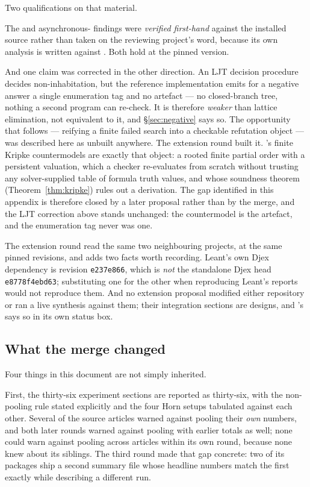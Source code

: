 Two qualifications on that material.

The  and asynchronous- findings were
\emph{verified first-hand} against the installed  source rather
than taken on the reviewing project's word, because its own analysis is written
against . Both hold at the pinned version.

And one claim was corrected in the other direction. An \textsf{LJT} decision
procedure decides non-inhabitation, but the reference implementation emits for
a negative answer a single enumeration tag and no artefact --- no closed-branch
tree, nothing a second program can re-check. It is therefore \emph{weaker} than
lattice elimination, not equivalent to it, and \S\ref{sec:negative} says so.
The opportunity that follows --- reifying a finite failed search into a
checkable refutation object --- was described here as unbuilt anywhere. The
extension round built it. 's finite Kripke countermodels are exactly
that object: a rooted finite partial order with a persistent valuation, which a
checker re-evaluates from scratch without trusting any solver-supplied table of
formula truth values, and whose soundness theorem
(Theorem~\ref{thm:kripke}) rules out a derivation. The gap identified in this
appendix is therefore closed by a later proposal rather than by the merge, and
the \textsf{LJT} correction above stands unchanged: the countermodel is the
artefact, and the enumeration tag never was one.

The extension round read the same two neighbouring projects, at the same pinned
revisions, and adds two facts worth recording. Leant's own Djex dependency is
revision \texttt{e237e866}, which is \emph{not} the standalone Djex head
\texttt{e8778f4ebd63}; substituting one for the other when reproducing Leant's
reports would not reproduce them. And no extension proposal modified either
repository or ran a live synthesis against them; their integration sections are
designs, and 's says so in its own status box.

\subsection{What the merge changed}

Four things in this document are not simply inherited.

First, the thirty-six experiment sections are reported as thirty-six, with the
non-pooling rule stated explicitly and the four Horn setups tabulated against
each other. Several of the source articles warned against pooling their
\emph{own} numbers, and both later rounds warned against pooling with earlier
totals as well; none could warn against pooling across articles within its own
round, because none knew about its siblings. The third round made that gap
concrete: two of its packages ship a second summary file whose headline numbers
match the first exactly while describing a different run.

